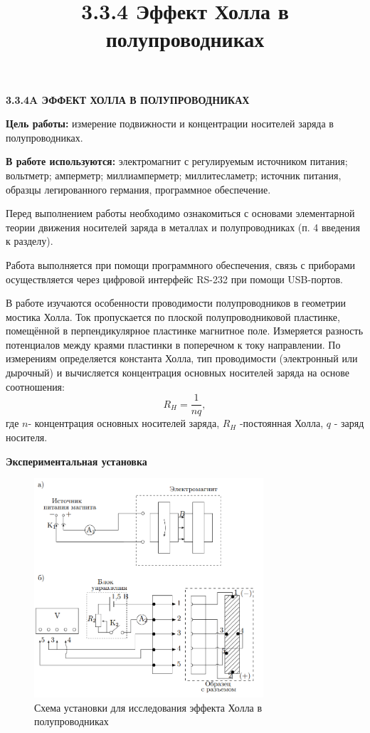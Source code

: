 \documentclass[a4paper,12pt]{article} %
\title{3.3.4 Эффект Холла в полупроводниках}
\date{}
\begin{document}
\begin{center}
\textsf{\textbf{3.3.4A ЭФФЕКТ ХОЛЛА В ПОЛУПРОВОДНИКАХ}}
\end{center}

\textbf{Цель работы:} измерение подвижности и концентрации носителей заряда
в полупроводниках.

\textbf{В работе используются:} электромагнит с регулируемым источником питания; вольтметр; амперметр; миллиамперметр; миллитесламетр; источник питания, образцы легированного германия, программное обеспечение.

Перед выполнением работы необходимо ознакомиться с основами элементарной теории движения носителей заряда в металлах и полупроводниках (п. 4 введения к разделу).

Работа выполняется при помощи программного обеспечения, связь с приборами осуществляется через цифровой интерфейс RS-232 при помощи USB-портов.

В работе изучаются особенности проводимости полупроводников в
геометрии мостика Холла. Ток пропускается по плоской полупроводниковой пластинке, помещённой в перпендикулярное пластинке магнитное
поле. Измеряется разность потенциалов между краями пластинки в поперечном к току направлении. По измерениям определяется константа
Холла, тип проводимости (электронный или дырочный) и вычисляется концентрация основных носителей заряда на основе соотношения:
\begin{equation}
R_H = \frac{1}{nq},
\end{equation}
где $n$- концентрация основных носителей заряда, $R_H$ -постоянная Холла, $q$ - заряд носителя.

\textbf{Экспериментальная установка}
\begin{figure}[h!]
\begin{center}
\includegraphics[width=0.76\textwidth]{Установка}
\caption{Схема установки для исследования эффекта Холла в полупроводниках} \label{установка}
\end{center}
\end{figure} 
\end{document}
